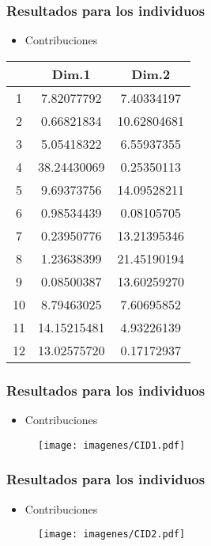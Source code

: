 \documentclass[12pt]{beamer}
\begin{document}
\begin{frame}
\frametitle{Resultados para los individuos}
\begin{itemize}
\item Contribuciones
\end{itemize}
\begin{center}
\begin{tabular}{|c|c|c|}
\hline
 & Dim.1  &     Dim.2 \\
\hline
1 &  7.82077792&  7.40334197 \\
2 &  0.66821834& 10.62804681\\
3 &  5.05418322&  6.55937355\\
4 & 38.24430069&  0.25350113\\
5 &  9.69373756& 14.09528211\\
6 &  0.98534439&  0.08105705\\
7 &  0.23950776& 13.21395346\\
8 &  1.23638399& 21.45190194\\
9 &  0.08500387& 13.60259270\\
10 & 8.79463025&  7.60695852\\
11 &14.15215481&  4.93226139\\
12 &13.02575720&  0.17172937\\
\hline
\end{tabular}
\end{center}
\end{frame}

\begin{frame}
\frametitle{Resultados para los individuos}
\begin{itemize}
\item Contribuciones
\end{itemize}
\begin{figure}[h]
  \centering
  \texttt{[image: imagenes/CID1.pdf]}
\end{figure}
\end{frame}

\begin{frame}
\frametitle{Resultados para los individuos}
\begin{itemize}
\item Contribuciones
\end{itemize}
\begin{figure}[h]
  \centering
  \texttt{[image: imagenes/CID2.pdf]}
\end{figure}
\end{frame}
\end{document}
